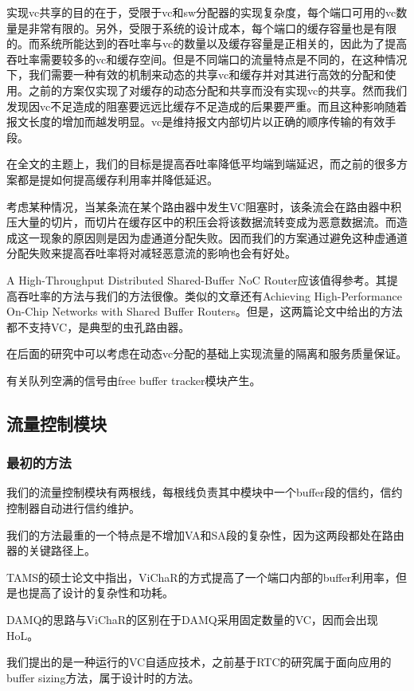 ﻿\documentclass[10pt,journal]{IEEEtran}
\begin{document}
实现vc共享的目的在于，受限于vc和sw分配器的实现复杂度，每个端口可用的vc数量是非常有限的。另外，受限于系统的设计成本，每个端口的缓存容量也是有限的。而系统所能达到的吞吐率与vc的数量以及缓存容量是正相关的，因此为了提高吞吐率需要较多的vc和缓存空间。但是不同端口的流量特点是不同的，在这种情况下，我们需要一种有效的机制来动态的共享vc和缓存并对其进行高效的分配和使用。之前的方案仅实现了对缓存的动态分配和共享而没有实现vc的共享。然而我们发现因vc不足造成的阻塞要远远比缓存不足造成的后果要严重。而且这种影响随着报文长度的增加而越发明显。vc是维持报文内部切片以正确的顺序传输的有效手段。

在全文的主题上，我们的目标是提高吞吐率降低平均端到端延迟，而之前的很多方案都是提如何提高缓存利用率并降低延迟。

考虑某种情况，当某条流在某个路由器中发生VC阻塞时，该条流会在路由器中积压大量的切片，而切片在缓存区中的积压会将该数据流转变成为恶意数据流。而造成这一现象的原因则是因为虚通道分配失败。因而我们的方案通过避免这种虚通道分配失败来提高吞吐率将对减轻恶意流的影响也会有好处。

A High-Throughput Distributed Shared-Buffer NoC Router应该值得参考。其提高吞吐率的方法与我们的方法很像。类似的文章还有Achieving High-Performance On-Chip Networks with Shared Buffer Routers。但是，这两篇论文中给出的方法都不支持VC，是典型的虫孔路由器。

在后面的研究中可以考虑在动态vc分配的基础上实现流量的隔离和服务质量保证。

有关队列空满的信号由free buffer tracker模块产生。

\subsection{流量控制模块}
\subsubsection{最初的方法}
我们的流量控制模块有两根线，每根线负责其中模块中一个buffer段的信约，信约控制器自动进行信约维护。

我们的方法最重的一个特点是不增加VA和SA段的复杂性，因为这两段都处在路由器的关键路径上。

TAMS的硕士论文中指出，ViChaR的方式提高了一个端口内部的buffer利用率，但是也提高了设计的复杂性和功耗。

DAMQ的思路与ViChaR的区别在于DAMQ采用固定数量的VC，因而会出现HoL。

我们提出的是一种运行的VC自适应技术，之前基于RTC的研究属于面向应用的buffer sizing方法，属于设计时的方法。
\end{document}
